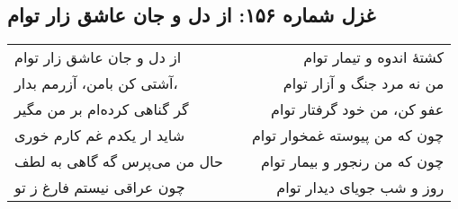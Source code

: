 \begin{center}
\section*{غزل شماره ۱۵۶: از دل و جان عاشق زار توام}
\label{sec:156}
\begin{longtable}{l p{0.5cm} r}
از دل و جان عاشق زار توام
&&
کشتهٔ اندوه و تیمار توام
\\
آشتی کن بامن، آزرمم بدار،
&&
من نه مرد جنگ و آزار توام
\\
گر گناهی کرده‌ام بر من مگیر
&&
عفو کن، من خود گرفتار توام
\\
شاید ار یکدم غم کارم خوری
&&
چون که من پیوسته غمخوار توام
\\
حال من می‌پرس گه گاهی به لطف
&&
چون که من رنجور و بیمار توام
\\
چون عراقی نیستم فارغ ز تو
&&
روز و شب جویای دیدار توام
\\
\end{longtable}
\end{center}
